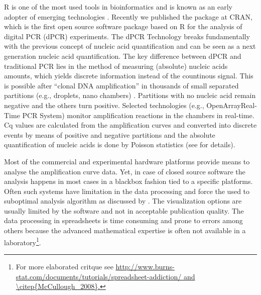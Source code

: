 R is one of the most used tools in bioinformatics and is known as an early 
adopter of emerging technologies \citep{pabinger_2014}. Recently we published 
the  package at CRAN, which is the first open source software 
package based on R for the analysis of digital PCR (dPCR) experiments. The dPCR 
Technology breaks fundamentally with the previous concept of nucleic acid 
quantification and can be seen as a next generation nucleic acid quantification. 
The key difference between dPCR and traditional PCR lies in the method of 
measuring (absolute) nucleic acids amounts, which yields discrete information
instead of the countinous signal. This is possible after ``clonal DNA 
amplification'' in thousands of small separated partitions (e.g., droplets, nano 
chambers) \citep{huggett_2013, milbury_2014, morley_2014}. Partitions with no 
nucleic acid remain negative and the others turn positive. Selected technologies 
(e.g., OpenArray\textregistered Real-Time PCR System) monitor amplification 
reactions in the chambers in real-time. Cq values are calculated from the 
amplification curves and converted into discrete events by means of positive and 
negative partitions and the absolute quantification of nucleic acids is done by 
Poisson statistics (see  for details).

Most of the commercial and experimental hardware platforms provide means to 
analyse the amplification curve data. Yet, in case of closed source software the 
analysis happens in most cases in a blackbox fashion tied to a specific 
platforms. Often such systems have limitation in the data processing and force 
the used to suboptimal analysis algorithm as discussed by \citet{ruijter_2013}. 
The visualization options are usually limited by the software and not in 
acceptable publication quality. The data processing in spreadsheets is time 
consuming and prone to errors among others because the advanced mathematical expertise is 
often not available in a laboratory\footnote{For more elaborated critque see \url{http://www.burns-stat.com/documents/tutorials/spreadsheet-addiction/ and \citep{McCullough_2008}.}}.

